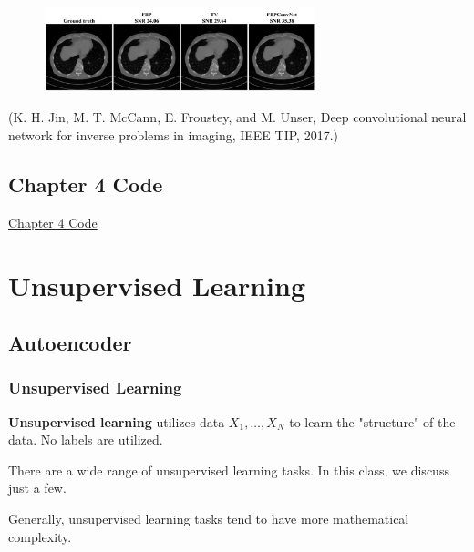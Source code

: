 \documentclass{report}
\begin{document}
\begin{concept}
    \begin{figure}[H]
        \centering
        \includegraphics[width=0.7\textwidth]{.././assets/8.29.png}
    \end{figure}

    (K. H. Jin, M. T. McCann, E. Froustey, and M. Unser, Deep convolutional neural network for inverse problems in imaging, IEEE TIP, 2017.)
\end{concept}

\chapter*{Chapter 4 Code}

\href{https://drive.google.com/file/d/16IOKVF6IiDMyUvL73pGKBaEMKyXvezLB/view?usp=sharing}{Chapter 4 Code}

\part{Unsupervised Learning}

\chapter{Autoencoder}

\section{Unsupervised Learning}

\begin{definition}
    \textbf{Unsupervised learning} utilizes data $X_{1}, \ldots, X_{N}$ to learn the "structure" of the data. No labels are utilized.

    There are a wide range of unsupervised learning tasks. In this class, we discuss just a few.

    Generally, unsupervised learning tasks tend to have more mathematical complexity.
\end{definition}
\end{document}
